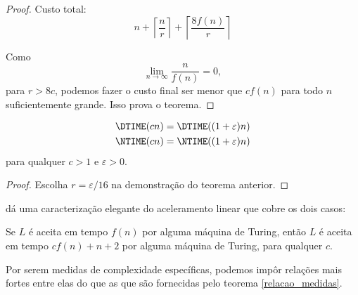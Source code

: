 \begin{proof}
    Custo total:
    \begin{equation*}
        n + \left\lceil \frac n r \right\rceil +
            \left\lceil \frac{8f(n)}{r} \right\rceil
    \end{equation*}

    Como
    \begin{equation*}
        \lim_{n \rightarrow \infty} \frac{n}{f(n)} = 0,
    \end{equation*}
    para $r > 8c$,
    podemos fazer o custo final
    ser menor que $cf(n)$ para todo $n$ suficientemente grande.
    Isso prova o teorema.
\end{proof}

\begin{theorem}
    \begin{align*}
        \DTIME(cn) &= \DTIME((1+\varepsilon)n) \\
        \NTIME(cn) &= \NTIME((1+\varepsilon)n)
    \end{align*}
    para qualquer $c > 1$ e $\varepsilon > 0$.
\end{theorem}

\begin{proof}
    Escolha $r = \varepsilon/16$ na demonstração do teorema anterior.
\end{proof}

dá uma caracterização elegante do aceleramento linear
que cobre os dois casos:
\begin{utheorem}
    Se $L$ é aceita em tempo $f(n)$ por alguma máquina de Turing,
    então $L$ é aceita em tempo $cf(n) + n + 2$ por alguma máquina de Turing,
    para qualquer $c$.
\end{utheorem}

Por serem medidas de complexidade específicas,
podemos impôr relações mais fortes entre elas
do que as que são fornecidas pelo teorema \ref{relacao_medidas}.


